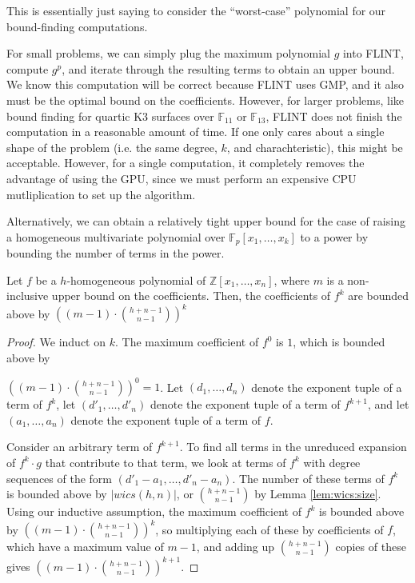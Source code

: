This is essentially just saying to consider the ``worst-case'' polynomial 
for our bound-finding computations.

For small problems, we can simply plug the maximum 
polynomial $g$ into FLINT, compute $g ^ p$, and 
iterate through the resulting terms to obtain an upper bound.
We know this computation will be correct because FLINT uses GMP,
and it also must be the optimal bound on the coefficients. 
However, for larger problems, like bound finding for 
quartic K3 surfaces over $\mathbb{F}_{11}$ or $\mathbb{F}_{13}$, 
FLINT does not finish the computation in a reasonable amount of time.
If one only cares about a single shape of the problem 
(i.e. the same degree, \(k\), and charachteristic),
this might be acceptable.
However, for a single computation, it completely removes 
the advantage of using the GPU, since we must perform an 
expensive CPU mutliplication to set up the algorithm.

Alternatively, we can obtain a relatively tight upper 
bound for the case of raising a homogeneous multivariate 
polynomial over $\mathbb{F}_p[x_1, \dots , x_k]$ to a power
by bounding the number of terms in the power. 

\begin{thm}
    Let $f$ be a $h$-homogeneous polynomial of $\mathbb{Z}[x_1, \dots, x_n]$, where $m$ is a non-inclusive upper bound on the coefficients. Then, the coefficients of $f ^ k$ are bounded above by $\left((m - 1) \cdot \binom{h + n - 1}{n - 1}\right)^ k$
\end{thm}

\begin{proof}
    We induct on $k$. The maximum coefficient of $f^0$ is $1$, which is bounded above by 
    
    \noindent$\left((m - 1) \cdot \binom{h + n - 1}{n - 1}\right)^ 0 = 1$.
    Let $(d_1, \dots , d_n)$ denote the exponent tuple of a term of $f^k$, let $(d'_1, \dots , d'_n)$ denote the exponent tuple of a term of $f^{k + 1}$, and let $(a_1, \dots , a_n)$ denote the exponent tuple of a term of $f$.

    Consider an arbitrary term of $f^{k + 1}$. To find all terms in the unreduced expansion of $f^k \cdot g$ that contribute to that term, we look at terms of $f^k$ with degree sequences of the form $(d'_1 - a_1, \dots , d'_n - a_n)$. The number of these terms of $f^k$ is bounded above by $|wics(h, n)|$, or $\binom{h + n - 1}{n - 1}$ by Lemma \ref{lem:wics:size}. Using our inductive assumption, the maximum coefficient of $f^k$ is bounded above by $\left((m - 1) \cdot \binom{h + n - 1}{n - 1}\right)^ k$, so multiplying each of these by coefficients of $f$, which have a maximum value of $m - 1$, and adding up $\binom{h + n - 1}{n - 1}$ copies of these gives $\left((m - 1) \cdot \binom{h + n - 1}{n - 1}\right)^{k + 1}$.
\end{proof}

